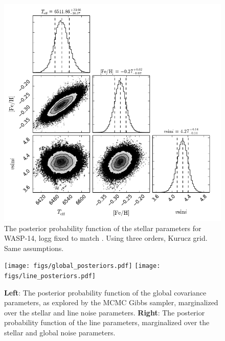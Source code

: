 \documentclass[iop,floatfix]{emulateapj}
\begin{document}
\begin{figure}[!htb]
\begin{center}
  \includegraphics[width=5in]{figs/stellar_triangle_WASP14_Kurucz.png}
  \caption{The posterior probability function of the stellar parameters for WASP-14, logg fixed to match \citep{torres12}. Using three orders, Kurucz grid. Same assumptions.}
\label{fig:stellar_posterior_logg}
\end{center}
\end{figure}

\begin{figure}[!htb]
\begin{center}
  \texttt{[image: figs/global\_posteriors.pdf]}
  \texttt{[image: figs/line\_posteriors.pdf]}
  \caption{\textbf{Left}: The posterior probability function of the global covariance parameters, as explored by the MCMC Gibbs sampler, marginalized over the stellar and line noise parameters. \textbf{Right}: The posterior probability function of the line parameters, marginalized over the stellar and global noise parameters.}
\label{fig:noise_posterior}
\end{center}
\end{figure}
\end{document}
